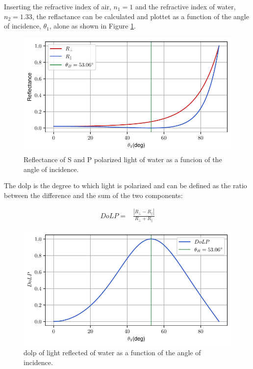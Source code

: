 Inserting the refractive index of air, $n_1 = 1$ and the refractive index of water, $n_2 = 1.33$, the reflactance can be calculated and plottet as a function of the angle of incidence, $\theta_1$, alone as shown in Figure \ref{fig:brewster0}.


\begin{figure}[H]
    \centering
    \includegraphics[width=\textwidth]{figures/pol_plots/brewster0.pdf}
    \caption{Reflectance of S and P polarized light of water as a funcion of the angle of incidence.}
    \label{fig:brewster0}
\end{figure}

The \gls{dolp} is the degree to which light is polarized and can be defined as the ratio between the difference and the sum of the two components:

\begin{align}
    DoLP= & \frac{\left | R_\perp - R_\parallel \right |}{R_\perp + R_\parallel}
\end{align}
\begin{figure}[H]
    \centering
    \includegraphics[width=\textwidth]{figures/pol_plots/brewster1.pdf}
    \caption{\gls{dolp} of light reflected of water as a function of the angle of incidence.}
    \label{fig:brewster1}
\end{figure}

